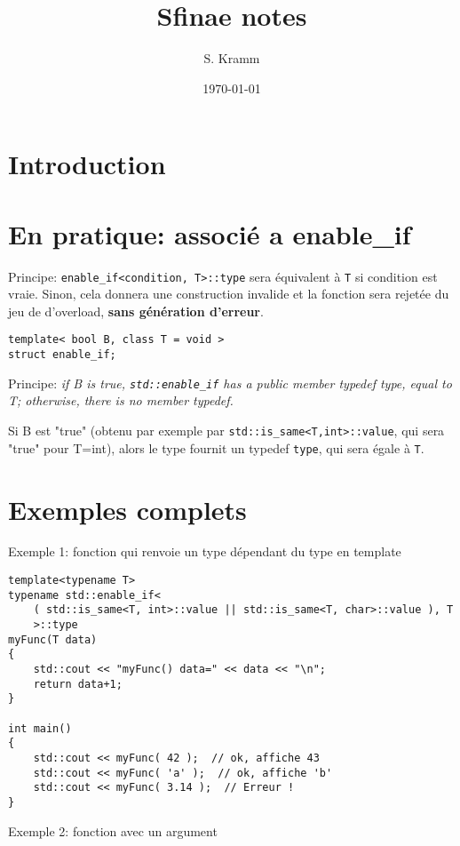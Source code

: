 \documentclass[11pt,a4paper,landscape,twocolumn]{article}
\author{S. Kramm}
\title{Sfinae notes}
\date{\today}
\begin{document}
\maketitle

\section{Introduction}



\section{En pratique: associé a enable\_if}

Principe: {\tt enable\_if<condition, T>::type} sera équivalent à {\tt T} si condition est vraie.
Sinon, cela donnera une construction invalide et la fonction sera rejetée du jeu de d'overload, {\bf sans génération d'erreur}.


\begin{lstlisting}
template< bool B, class T = void >
struct enable_if;
\end{lstlisting}

Principe:
{\em if B is true, {\tt std::enable\_if} has a public member typedef type, equal to T; otherwise, there is no member typedef. }

Si B est "true" (obtenu par exemple par {\tt std::is\_same<T,int>::value}, qui sera "true" pour T=int), alors le type fournit un typedef {\tt type}, qui sera égale à {\tt T}.


\section{Exemples complets}


Exemple 1: fonction qui renvoie un type dépendant du type en template

\begin{lstlisting}
template<typename T>
typename std::enable_if<
	( std::is_same<T, int>::value || std::is_same<T, char>::value ), T
	>::type
myFunc(T data)
{
	std::cout << "myFunc() data=" << data << "\n";
	return data+1;
}

int main()
{
    std::cout << myFunc( 42 );  // ok, affiche 43
    std::cout << myFunc( 'a' );  // ok, affiche 'b'
    std::cout << myFunc( 3.14 );  // Erreur !        
}
\end{lstlisting}



Exemple 2: fonction avec un argument
\end{document}
